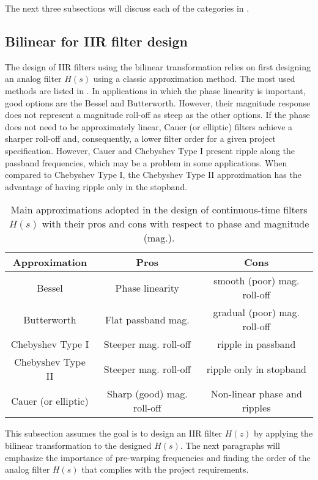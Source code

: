 The next three subsections will discuss each of the
categories in .

\subsection{Bilinear for IIR filter design}
\label{sec:bilinear_for_iir}

The design of IIR filters using the bilinear transformation relies on first 
designing an analog filter $H(s)$ using a classic approximation method.
The most used methods are listed in . 
In applications in which the phase linearity is important, good options
are the Bessel and Butterworth. However, their magnitude response does not
represent a magnitude roll-off as steep as the other options.
If the phase does not need to be approximately linear, 
Cauer (or elliptic) filters achieve a sharper roll-off and, consequently,
a lower filter order for a given project specification.
However, Cauer and Chebyshev Type I present ripple along the passband frequencies,
which may be a problem in some applications.
When compared to Chebyshev Type I, the Chebyshev Type II approximation has the advantage of 
having ripple only in the stopband.

\begin{table}
    \centering
    \caption{Main approximations adopted in the design of continuous-time filters $H(s)$ with their pros and cons
		with respect to phase and magnitude (mag.).}
    \label{tab:filter_approximations}
    \begin{tabular}{ccc}
        \toprule
        Approximation & Pros & Cons \\
        \midrule
				Bessel & Phase linearity & smooth (poor) mag. roll-off  \\
        Butterworth  & Flat passband mag. & gradual (poor) mag. roll-off \\
        Chebyshev Type I  & Steeper mag. roll-off  & ripple in passband \\
        Chebyshev Type II & Steeper mag. roll-off  & ripple only in stopband \\
        Cauer (or elliptic) & Sharp (good) mag. roll-off & Non-linear phase and ripples \\
        \bottomrule
    \end{tabular}
\end{table}

This subsection assumes the goal is to design an IIR filter $H(z)$ by applying the bilinear transformation to the designed $H(s)$.
The next paragraphs will emphasize the importance of pre-warping frequencies and finding the order of the analog filter $H(s)$ that complies with the project requirements.

